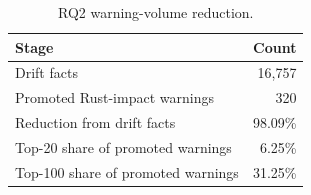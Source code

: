 \begin{table}[t]
\centering
\caption{RQ2 warning-volume reduction.}
\label{tab:rq2-warning-volume}
\begin{tabular}{lr}
\toprule
Stage & Count \\
\midrule
Drift facts & 16,757 \\
Promoted Rust-impact warnings & 320 \\
Reduction from drift facts & 98.09\% \\
Top-20 share of promoted warnings & 6.25\% \\
Top-100 share of promoted warnings & 31.25\% \\
\bottomrule
\end{tabular}
\end{table}
